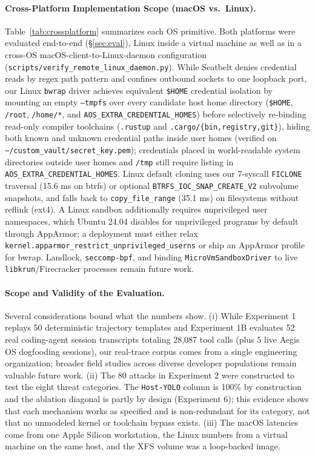 \documentclass[10pt,twocolumn]{article}
\begin{document}
\paragraph{Cross-Platform Implementation Scope (macOS vs.\ Linux).} Table~\ref{tab:crossplatform} summarizes each OS primitive. Both platforms were evaluated end-to-end (\S\ref{sec:eval}), Linux inside a virtual machine as well as in a cross-OS macOS-client-to-Linux-daemon configuration (\texttt{scripts/verify\_remote\_linux\_daemon.py}). While Seatbelt denies credential reads by regex path pattern and confines outbound sockets to one loopback port, our Linux \texttt{bwrap} driver achieves equivalent \texttt{\$HOME} credential isolation by mounting an empty \texttt{--tmpfs} over every candidate host home directory (\texttt{\$HOME}, \texttt{/root}, \texttt{/home/*}, and \texttt{AOS\_EXTRA\_CREDENTIAL\_HOMES}) before selectively re-binding read-only compiler toolchains (\texttt{.rustup} and \texttt{.cargo/\{bin,registry,git\}}), hiding both known and unknown credential paths inside user homes (verified on \texttt{\textasciitilde/custom\_vault/secret\_key.pem}); credentials placed in world-readable system directories outside user homes and \texttt{/tmp} still require listing in \texttt{AOS\_EXTRA\_CREDENTIAL\_HOMES}. Linux default cloning uses our 7-syscall \texttt{FICLONE} traversal (15.6 ms on btrfs) or optional \texttt{BTRFS\_IOC\_SNAP\_CREATE\_V2} subvolume snapshots, and falls back to \texttt{copy\_file\_range} (35.1 ms) on filesystems without reflink (ext4). A Linux sandbox additionally requires unprivileged user namespaces, which Ubuntu 24.04 disables for unprivileged programs by default through AppArmor; a deployment must either relax \texttt{kernel.apparmor\_restrict\_unprivileged\_userns} or ship an AppArmor profile for bwrap. Landlock, \texttt{seccomp-bpf}, and binding \texttt{MicroVmSandboxDriver} to live \texttt{libkrun}/Firecracker processes remain future work.

\paragraph{Scope and Validity of the Evaluation.} Several considerations bound what the numbers show. (i) While Experiment 1 replays 50 deterministic trajectory templates and Experiment 1B evaluates 52 real coding-agent session transcripts totaling 28,087 tool calls (plus 5 live Aegis OS dogfooding sessions), our real-trace corpus comes from a single engineering organization; broader field studies across diverse developer populations remain valuable future work. (ii) The 80 attacks in Experiment 2 were constructed to test the eight threat categories. The \texttt{Host-YOLO} column is 100\% by construction and the ablation diagonal is partly by design (Experiment 6); this evidence shows that each mechanism works as specified and is non-redundant for its category, not that no unmodeled kernel or toolchain bypass exists. (iii) The macOS latencies come from one Apple Silicon workstation, the Linux numbers from a virtual machine on the same host, and the XFS volume was a loop-backed image.
\end{document}
